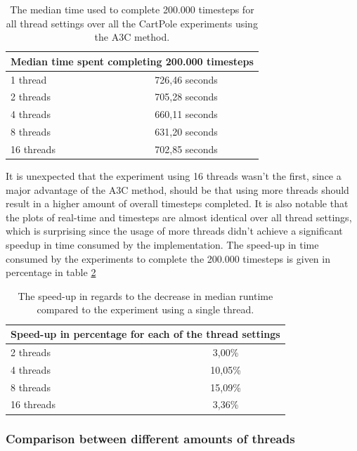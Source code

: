 \documentclass[11pt]{article}
\begin{document}
\begin{table}[H]
    \centering
 \begin{tabular}{ |l|c| }
  \hline
  \multicolumn{2}{|c|}{Median time spent completing 200.000 timesteps} \\
  \hline
  1 thread & 726,46 seconds \\
  \hline
  2 threads & 705,28 seconds \\
  \hline
  4 threads & 660,11 seconds \\
  \hline
  8 threads & 631,20 seconds \\
  \hline
  16 threads & 702,85 seconds \\
  \hline
 \end{tabular}
 \caption{The median time used to complete 200.000 timesteps
 for all thread settings over all the CartPole experiments using the A3C method.}
    \label{tab:time}
\end{table}

It is unexpected that the experiment using 16 threads wasn't the first,
since a major advantage of the A3C method,
should be that using more threads should result in a higher amount of overall timesteps completed.
It is also notable that the plots of real-time and timesteps are almost identical
over all thread settings, which is surprising since the usage of more
threads didn't achieve a significant speedup
in time consumed by the implementation.
The speed-up in time consumed by the experiments to complete the 200.000
timesteps is given in percentage in table \ref{tab:cp_compare}

\begin{table}[H]
    \centering
 \begin{tabular}{ |l|c| }
  \hline
  \multicolumn{2}{|c|}{Speed-up in percentage for each of the thread settings} \\
  \hline
  2 threads & 3,00\%\\
  \hline
  4 threads & 10,05\%\\
  \hline
  8 threads & 15,09\% \\
  \hline
  16 threads & 3,36\% \\
  \hline
 \end{tabular}
 \caption{The speed-up in regards to the decrease in median runtime compared to
 the experiment using a single thread.}
    \label{tab:cp_compare}
\end{table}


\subsubsection{Comparison between different amounts of threads}
\end{document}
